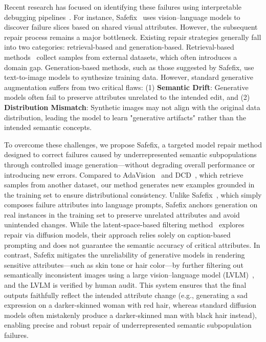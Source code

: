 \documentclass[10pt]{article} %
\newcommand{\model}{Safefix\xspace}
\newcommand{\hibug}{Safefix\xspace}
\begin{document}
Recent research has focused on identifying these failures using interpretable debugging pipelines~\citep{gao2023adaptive,chen2023hibug,singla2024data}. For instance, \hibug~\citep{chen2023hibug} uses vision--language models to discover failure slices based on shared visual attributes. However, the subsequent repair process remains a major bottleneck. Existing repair strategies generally fall into two categories: retrieval-based and generation-based. Retrieval-based methods~\citep{gao2023adaptive,singla2024data} collect samples from external datasets, which often introduces a domain gap. Generation-based methods, such as those suggested by \hibug, use text-to-image models to synthesize training data. However, standard generative augmentation suffers from two critical flaws: (1) \textbf{Semantic Drift}: Generative models often fail to preserve attributes unrelated to the intended edit, and (2) \textbf{Distribution Mismatch}: Synthetic images may not align with the original data distribution, leading the model to learn "generative artifacts" rather than the intended semantic concepts.

To overcome these challenges, we propose \model, a targeted model repair method designed to correct failures caused by underrepresented semantic subpopulations through controlled image generation—without degrading overall performance or introducing new errors. Compared to AdaVision~\citep{gao2023adaptive} and DCD~\citep{singla2024data}, which retrieve samples from another dataset, our method generates new examples grounded in the training set to ensure distributional consistency. Unlike \hibug~\citep{chen2023hibug}, which simply composes failure attributes into language prompts, \model anchors generation on real instances in the training set to preserve unrelated attributes and avoid unintended changes. While the latent-space-based filtering method~\citep{jain2023latentfailures} explores repair via diffusion models, their approach relies solely on caption-based prompting and does not guarantee the semantic accuracy of critical attributes. In contrast, \model mitigates the unreliability of generative models in rendering sensitive attributes—such as skin tone or hair color—by further filtering out semantically inconsistent images using a large vision--language model (LVLM)~\citep{bai2025qwen25vl, liu2023improvedllava}, and the LVLM is verified by human audit. This  system ensures that the final outputs faithfully reflect the intended attribute change (e.g., generating a sad expression on a darker-skinned woman with red hair, whereas standard diffusion models often mistakenly produce a darker-skinned man with black hair instead), enabling precise and robust repair of underrepresented semantic subpopulation failures.
\end{document}
